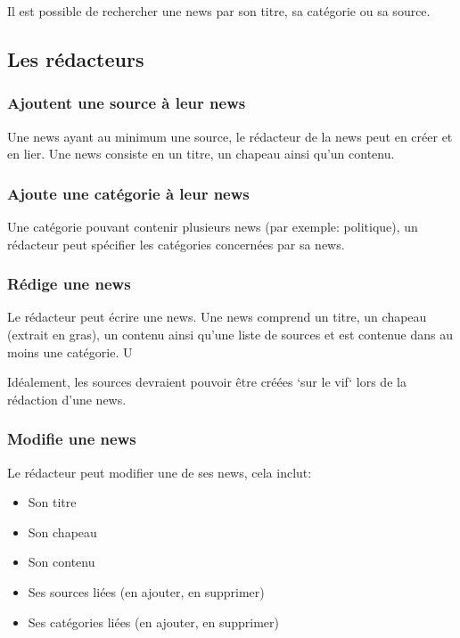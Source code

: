 \documentclass{article}
\begin{document}
Il est possible de rechercher une news par son titre, sa catégorie ou sa source.

\subsection{Les rédacteurs}

\subsubsection{Ajoutent une source à leur news}

Une news ayant au minimum une source, le rédacteur de la news peut en créer et en lier. Une news consiste en un titre, un chapeau ainsi qu'un contenu. 

\subsubsection{Ajoute une catégorie à leur news}

Une catégorie pouvant contenir plusieurs news (par exemple: politique), un rédacteur peut spécifier les catégories concernées par sa news.

\subsubsection{Rédige une news}

Le rédacteur peut écrire une news. Une news comprend un titre, un chapeau (extrait en gras), un contenu ainsi qu'une liste de sources et est contenue dans au moins une catégorie. U

Idéalement, les sources devraient pouvoir être créées `sur le vif` lors de la rédaction d'une news.

\subsubsection{Modifie une news}

Le rédacteur peut modifier une de ses news, cela inclut:
\begin{itemize}
\item Son titre
\item Son chapeau
\item Son contenu
\item Ses sources liées (en ajouter, en supprimer)
\item Ses catégories liées (en ajouter, en supprimer)
\end{itemize}
\end{document}
